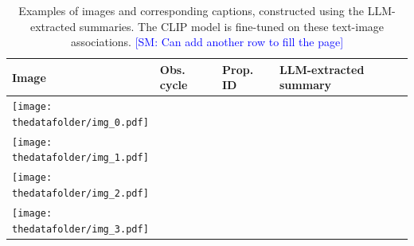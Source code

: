 \documentclass[10pt]{article} %
\newcommand{\SM}[1]{\textcolor{blue}{[SM: #1]}}
\newcommand{\datafolder}[1]{\def\thedatafolder{#1}}
\begin{document}
\datafolder{./plots/data/}
 
\begin{table}[h!]
      \centering
      \begin{tabular}{m{} p{1.9cm} p{1.9cm} m{8cm}}
          \toprule
          \centering \bfseries Image & \centering \bfseries Obs. cycle & \centering \bfseries Prop. ID & \centering \bfseries LLM-extracted summary \tabularnewline
          \midrule
          \centering \texttt{[image: \\thedatafolder/img\_0.pdf]} & \centering  & \centering  &  {\scriptsize } \tabularnewline
          \midrule
          \centering \texttt{[image: \\thedatafolder/img\_1.pdf]} & \centering  & \centering  &  {\scriptsize } \tabularnewline
          \midrule
          \centering \texttt{[image: \\thedatafolder/img\_2.pdf]} & \centering  & \centering  &  {\scriptsize } \tabularnewline
          \midrule
          \centering \texttt{[image: \\thedatafolder/img\_3.pdf]} & \centering  & \centering  &  {\scriptsize } \tabularnewline
          \bottomrule
      \end{tabular}
      \caption{Examples of images and corresponding captions, constructed using the LLM-extracted summaries. The CLIP model is fine-tuned on these text-image associations. \SM{Can add another row to fill the page}}
      \label{tab:dataset}
  \end{table}
\end{document}
